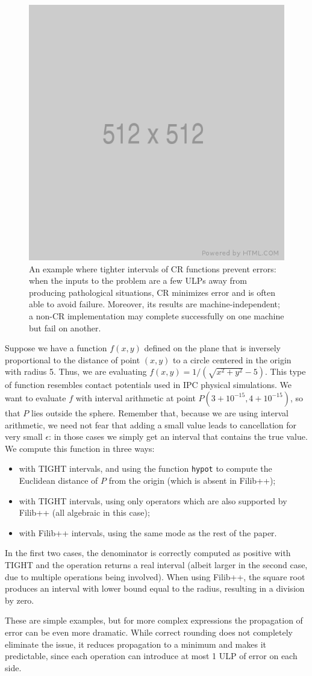 \begin{figure}
	\includegraphics[width=0.4\linewidth]{fig/512x512.png}
	\centering
	\caption{An example where tighter intervals of CR functions prevent errors: when the inputs to the problem are a few ULPs away from producing pathological situations, CR minimizes error and is often able to avoid failure. Moreover, its results are machine-independent; a non-CR implementation may complete successfully on one machine but fail on another.}
	\label{fig:tori}
\end{figure}
Suppose we have a function $f(x,y)$ defined on the plane that is inversely proportional to the distance of point $(x,y)$ to a circle centered in the origin with radius 5.
Thus, we are evaluating $f(x,y) = 1/(\sqrt{x^2 + y^2}-5)$.
This type of function resembles contact potentials used in IPC physical simulations.
We want to evaluate $f$ with interval arithmetic at point $P(3+10^{-15},4+10^{-15})$, so that $P$ lies outside the sphere. Remember that, because we are using interval arithmetic, we need not fear that adding a small value leads to cancellation for very small $\epsilon$: in those cases we simply get an interval that contains the true value.
We compute this function in three ways:
\begin{itemize}
	\item with TIGHT intervals, and using the function \texttt{hypot} to compute the Euclidean distance of $P$ from the origin (which is absent in Filib++);
	\item with TIGHT intervals, using only operators which are also supported by Filib++ (all algebraic in this case);
	\item with Filib++ intervals, using the same mode as the rest of the paper.
\end{itemize}
In the first two cases, the denominator is correctly computed as positive with TIGHT and the operation returns a real interval (albeit larger in the second case, due to multiple operations being involved).
When using Filib++, the square root produces an interval with lower bound equal to the radius, resulting in a division by zero.


These are simple examples, but for more complex expressions the propagation of error can be even more dramatic. While correct rounding does not completely eliminate the issue, it reduces propagation to a minimum and makes it predictable, since each operation can introduce at most 1 ULP of error on each side.

%
